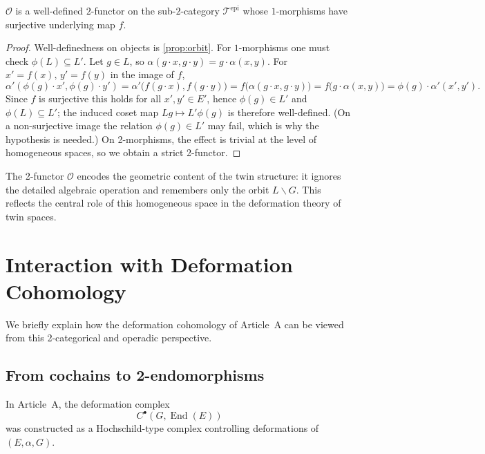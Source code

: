 \documentclass[11pt,a4paper]{article}
\numberwithin{equation}{section}
\DeclareMathOperator{\End}{End}
\newcommand{\TwinSpace}{(E,\alpha,G)}
\newcommand{\Twin}{\mathcal{T}}
\newcommand{\LinearSubgroup}{L}
\newcommand{\Cochain}{C}
\begin{document}
	\begin{proposition}
		$\mathcal{O}$ is a well-defined $2$-functor on the sub-$2$-category $\Twin^{\mathrm{epi}}$ whose
		$1$-morphisms have surjective underlying map $f$.
	\end{proposition}
	
	\begin{proof}
		Well-definedness on objects is \cref{prop:orbit}. For $1$-morphisms one must check $\phi(\LinearSubgroup)\subseteq\LinearSubgroup'$. Let
		$g\in\LinearSubgroup$, so $\alpha(g\cdot x,g\cdot y)=g\cdot\alpha(x,y)$. For $x'=f(x),\,y'=f(y)$ in the image of $f$,
		\[
			\alpha'(\phi(g)\cdot x',\phi(g)\cdot y')=\alpha'\big(f(g\cdot x),f(g\cdot y)\big)=f\big(\alpha(g\cdot x,g\cdot y)\big)
			=f\big(g\cdot\alpha(x,y)\big)=\phi(g)\cdot\alpha'(x',y').
		\]
		Since $f$ is surjective this holds for all $x',y'\in E'$, hence $\phi(g)\in\LinearSubgroup'$ and
		$\phi(\LinearSubgroup)\subseteq\LinearSubgroup'$; the induced coset map
		$\LinearSubgroup g\mapsto\LinearSubgroup'\phi(g)$ is therefore well-defined. (On a non-surjective image
		the relation $\phi(g)\in\LinearSubgroup'$ may fail, which is why the hypothesis is needed.) On 2-morphisms, the effect is trivial at the level
		of homogeneous spaces, so we obtain a strict 2-functor.
	\end{proof}
	
	\begin{remark}
		The 2-functor $\mathcal{O}$ encodes the geometric content of the twin structure: it ignores
		the detailed algebraic operation and remembers only the orbit $\LinearSubgroup\backslash G$.
		This reflects the central role of this homogeneous space in the deformation theory of twin spaces.
	\end{remark}
	
	\section{Interaction with Deformation Cohomology}
	\label{sec:interaction}
	
	We briefly explain how the deformation cohomology of Article~A can be viewed from this 2-categorical
	and operadic perspective.
	
	\subsection{From cochains to 2-endomorphisms}
	
	In Article~A, the deformation complex 
	\[
	\Cochain^\bullet(G,\End(E))
	\]
	was constructed as a Hochschild-type complex controlling deformations of $\TwinSpace$.
	
\end{document}
